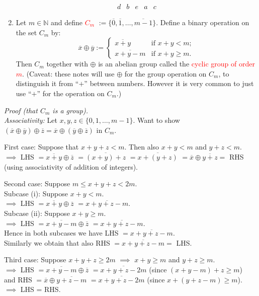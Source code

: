 \documentclass[
  12pt,
  a4paper,
  twoside]{article}
\theoremstyle{plain}
\theoremstyle{definition}
\begin{document}
\begin{enumerate}
\[\begin{array}{ccccc}
  d&b&e&a&c
  \end{array}
  \]
\item
  Let \(m\in\mathbb{N}\) and define \textcolor{red}{$C_m$} \(:=\{\overline{0},\overline{1},\dots,\overline{m-1}\}\). Define a binary operation on the set \(C_m\) by:
  \[
  \overline{x} \oplus \overline{y} :=
  \begin{cases}
  \overline{x+y} & \text{if }x+y<m;\\
  \overline{x+y-m} & \text{if }x+y\geq m.
  \end{cases}
  \]
  Then \(C_m\) together with \(\oplus\) is an abelian group called the \textcolor{red}{cyclic group of order $m$}. (Caveat: these notes will use \(\oplus\) for the group operation on \(C_m\), to distinguish it from ``\(+\)'' between numbers. However it is very common to just use ``\(+\)'' for the operation on \(C_m\).)
\end{enumerate}

\emph{Proof (that \(C_m\) is a group).}\\
\emph{Associativity:} Let \(x,y,z\in \{0,1,\dots,m-1\}\). Want to show \((\overline{x}\oplus\overline{y})\oplus\overline{z} = \overline{x} \oplus(\overline{y}\oplus\overline{z})\) in \(C_m\).

First case: Suppose that \(x+y+z<m\). Then also \(x+y<m\) and \(y+z<m\).\\
\(\implies\) LHS \(=\overline{x+y}\oplus\overline{z}\) \(=\overline{(x+y)+z}\) \(=\overline{x+(y+z)}\) \(=\overline{x}\oplus\overline{y+z}=\) RHS (using associativity of addition of integers).

Second case: Suppose \(m\leq x+y+z<2m\).\\
Subcase (i): Suppose \(x+y<m\).\\
\(\implies\) LHS \(=\overline{x+y}\oplus \overline{z}\) \(= \overline{x+y+z-m}\).\\
Subcase (ii): Suppose \(x+y \geq m\).\\
\(\implies\) LHS \(=\overline{x+y-m}\oplus\overline{z}\) \(= \overline{x+y+z-m}\).\\
Hence in both subcases we have LHS \(=\overline{x+y+z-m}\).\\
Similarly we obtain that also RHS \(=\overline{x+y+z-m} =\) LHS.

Third case: Suppose \(x+y+z\geq 2m\) \(\implies\) \(x+y\geq m\) and \(y+z\geq m\).\\
\(\implies\) LHS \(=\overline{x+y-m}\oplus\overline{z}\) \(=\overline{x+y+z-2m}\) (since \((x+y-m)+z \geq m\))\\
and RHS \(=\overline{x}\oplus\overline{y+z-m}\) \(=\overline{x+y+z-2m}\) (since \(x+(y+z-m)\geq m\)).\\
\(\implies\) LHS = RHS.
\end{document}
